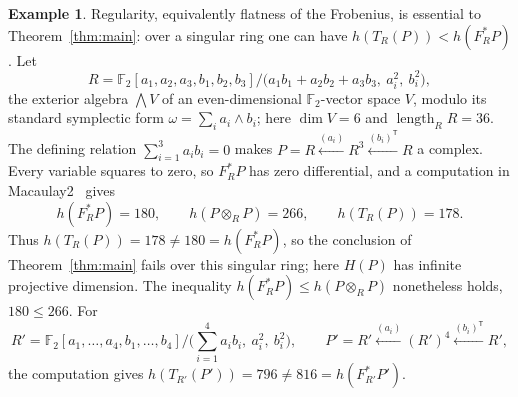 \documentclass[11pt,reqno]{amsart}
\theoremstyle{plain}
\theoremstyle{definition}
\newtheorem{example}[theorem]{Example}
\DeclareMathOperator{\length}{length}
\newcommand{\Ff}{\mathbb{F}}
\newcommand{\Tate}{T}                 %
\newcommand{\Frob}{F_R^{*}}           %
\newcommand{\htot}{h}
\begin{document}
\begin{example}
Regularity, equivalently flatness of the Frobenius, is essential to Theorem~\ref{thm:main}: over a
singular ring one can have $\htot(\Tate_R(P))<\htot(F_R^*P)$.  Let
\[
R=\Ff_2[a_1,a_2,a_3,b_1,b_2,b_3]\big/\bigl(a_1b_1+a_2b_2+a_3b_3,\ a_i^2,\ b_i^2\bigr),
\]
the exterior algebra $\bigwedge V$ of an even-dimensional $\Ff_2$-vector space $V$, modulo its standard
symplectic form $\omega=\sum_i a_i\wedge b_i$; here $\dim V=6$ and $\length_R R=36$.
The defining relation $\sum_{i=1}^3 a_ib_i=0$ makes
$P=R\xleftarrow{(a_i)}R^{3}\xleftarrow{(b_i)^{\mathsf T}}R$ a complex.  Every
variable squares to zero, so $\Frob P$ has zero differential, and a computation in
Macaulay2~\cite{M2} gives
\[
\htot(\Frob P)=180,\qquad \htot(P\otimes_R P)=266,\qquad \htot(\Tate_R(P))=178.
\]
Thus $\htot(\Tate_R(P))=178\ne180=\htot(\Frob P)$, so the conclusion of Theorem~\ref{thm:main} fails
over this singular ring; here $H(P)$ has infinite projective dimension.  The inequality
$\htot(\Frob P)\le\htot(P\otimes_R P)$ nonetheless holds, $180\le266$.  For
\[
 R'=\Ff_2[a_1,\ldots,a_4,b_1,\ldots,b_4]/\bigl(\textstyle\sum_{i=1}^4a_ib_i,\ a_i^2,\ b_i^2\bigr),
 \qquad P'=R'\xleftarrow{(a_i)}(R')^4\xleftarrow{(b_i)^{\mathsf T}}R',
\]
the computation gives $\htot(\Tate_{R'}(P'))=796\ne816=\htot(F_{R'}^*P')$.
\end{example}
\raggedbottom
\end{document}
